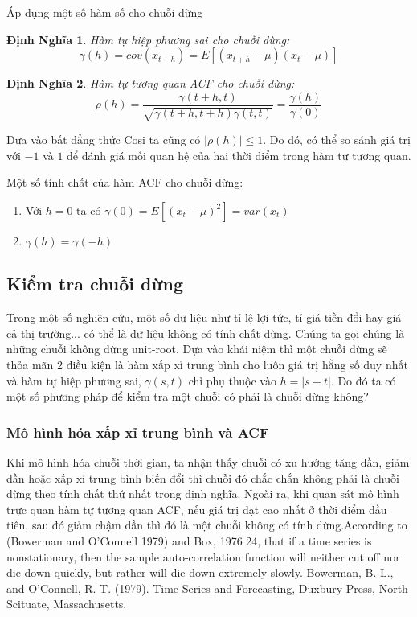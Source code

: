 \documentclass[twoside,12pt]{Latex/Classes/PhDthesisPSnPDF}
\newtheorem{defi}{Định Nghĩa}[chapter]
\begin{document}
Áp dụng một số hàm số cho chuỗi dừng

\begin{defi}
Hàm tự hiệp phương sai cho chuỗi dừng:
	\begin{equation}
		\gamma(h) = cov(x_{t+h}) = E[(x_{t+h}-\mu)(x_t-\mu)]
	\end{equation}
\end{defi}

\begin{defi}
Hàm tự tương quan ACF cho chuỗi dừng:
\begin{equation}
	\rho(h) = \frac{\gamma(t+h,t)}{\sqrt{\gamma(t+h,t+h)\gamma(t,t)}}=\frac{\gamma(h)}{\gamma(0)}
\end{equation}
\end{defi}
Dựa vào bất đẳng thức Cosi ta cũng có $|\rho(h)| \leq 1$. Do đó, có thể so sánh giá trị với $-1$ và $1$ để đánh giá mối quan hệ của hai thời điểm trong hàm tự tương quan.

Một số tính chất của hàm ACF cho chuỗi dừng:
\begin{enumerate}
	\item Với $h=0$ ta có $\gamma(0) = E[(x_t-\mu)^2] = var(x_t)$ 
	\item $\gamma(h)=\gamma(-h)$
\end{enumerate}
\subsection{Kiểm tra chuỗi dừng}\label{1.2.2}
Trong một số nghiên cứu, một số dữ liệu như tỉ lệ lợi tức, tỉ giá tiền đổi hay giá cả thị trường... có thể là dữ liệu không có tính chất dừng. Chúng ta gọi chúng là những chuỗi không dừng unit-root.
Dựa vào khái niệm thì một chuỗi dừng sẽ thỏa mãn 2 điều kiện là hàm xấp xỉ trung bình cho luôn giá trị hằng số duy nhất và hàm tự hiệp phương sai, $\gamma(s,t)$ chỉ phụ thuộc vào $h=|s-t|$. Do đó ta có một số phương pháp để kiểm tra một chuỗi có phải là chuỗi dừng không?
\subsubsection{Mô hình hóa xấp xỉ trung bình và ACF}
Khi mô hình hóa chuỗi thời gian, ta nhận thấy chuỗi có xu hướng tăng dần, giảm dần hoặc xấp xỉ trung bình biến đổi thì chuỗi đó chắc chắn không phải là chuỗi dừng theo tính chất thứ nhất trong định nghĩa.
Ngoài ra, khi quan sát mô hình trực quan hàm tự tương quan ACF, nếu giá trị đạt cao nhất ở thời điểm đầu tiên, sau đó giảm chậm dần thì đó là một chuỗi không có tính dừng.According to (Bowerman and O'Connell 1979) and Box, 1976 24, that if a time series is nonstationary, then the sample auto-correlation function will neither cut off nor die down quickly, but rather will die down extremely slowly.
Bowerman, B. L., and O'Connell, R. T. (1979). Time Series and Forecasting, Duxbury Press, North Scituate, Massachusetts.
\end{document}
